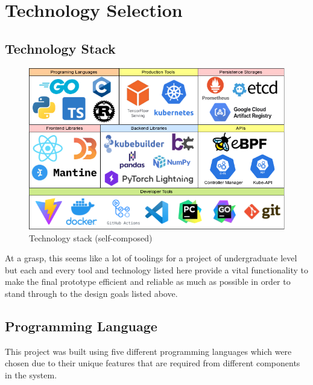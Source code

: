 \section{Technology Selection}
\subsection{Technology Stack}

\begin{figure}[H] 
    \includegraphics[width=16cm]{assets/implementation/technology-stack.png}
    \caption{Technology stack (self-composed)}
    \label{fig:technology-stack}
\end{figure}

At a grasp, this seems like a lot of toolings for a project of undergraduate level but each and every tool and technology listed here provide a vital functionality to make the final prototype efficient and reliable as much as possible in order to stand through to the design goals listed above.

\subsection{Programming Language}

This project was built using five different programming languages which were chosen due to their unique features that are required from different components in the system.


